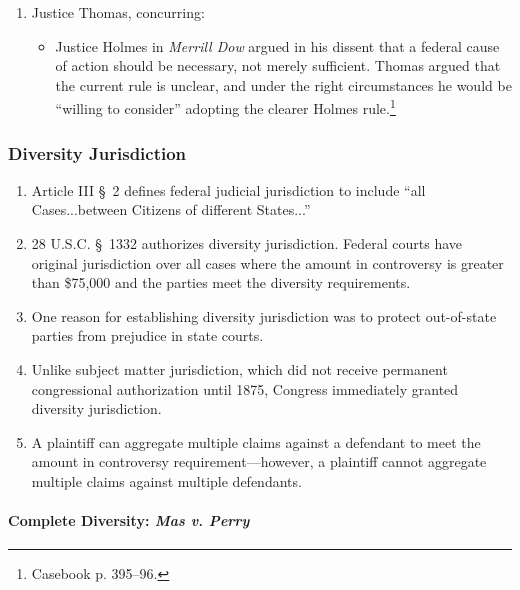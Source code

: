 \begin{enumerate}
\begin{itemize}
        \item The Court saw the absence of a federal cause of action ``not as a missing federal door key, always required, but as a missing welcome mat, required in the circumstances...''\footnote{Casebook p. 394.}
        \item Affirmed.
    \end{itemize}
    \item Justice Thomas, concurring:
    \begin{itemize}
        \item Justice Holmes in \emph{Merrill Dow} argued in his dissent that a federal cause of action should be necessary, not merely sufficient. Thomas argued that the current rule is unclear, and under the right circumstances he would be ``willing to consider'' adopting the clearer Holmes rule.\footnote{Casebook p. 395--96.}
    \end{itemize}
\end{enumerate}

\subsubsection{Diversity Jurisdiction}

\begin{enumerate}
    \item Article III \S\ 2 defines federal judicial jurisdiction to include ``all Cases...between Citizens of different States...''
    \item 28 U.S.C. \S\ 1332 authorizes diversity jurisdiction. Federal courts have original jurisdiction over all cases where the amount in controversy is greater than \$75,000 and the parties meet the diversity requirements.
    \item One reason for establishing diversity jurisdiction was to protect out-of-state parties from prejudice in state courts.
    \item Unlike subject matter jurisdiction, which did not receive permanent congressional authorization until 1875, Congress immediately granted diversity jurisdiction.
    \item A plaintiff can aggregate multiple claims against a defendant to meet the amount in controversy requirement---however, a plaintiff cannot aggregate multiple claims against multiple defendants.
\end{enumerate}

\paragraph{Complete Diversity: \emph{Mas v. Perry}}

